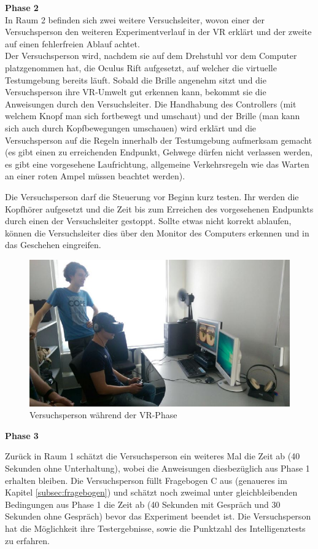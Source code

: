 \documentclass{Bericht}
\begin{document}
\textbf{Phase 2}\\ 
In Raum 2 befinden sich zwei weitere Versuchsleiter, wovon einer der Versuchsperson den weiteren Experimentverlauf in der VR erklärt und der zweite auf einen fehlerfreien Ablauf achtet.\\
Der Versuchsperson wird, nachdem sie auf dem Drehstuhl vor dem Computer platzgenommen hat, die Oculus Rift aufgesetzt, auf welcher die virtuelle Testumgebung bereits läuft. Sobald die Brille angenehm sitzt und die Versuchsperson ihre VR-Umwelt gut erkennen kann, bekommt sie die Anweisungen durch den Versuchsleiter. 
Die Handhabung des Controllers (mit welchem Knopf man sich fortbewegt und umschaut) und der Brille (man kann sich auch durch Kopfbewegungen umschauen) wird erklärt und die Versuchsperson auf die Regeln innerhalb der Testumgebung aufmerksam gemacht (es gibt einen zu erreichenden Endpunkt, Gehwege dürfen nicht verlassen werden, es gibt eine vorgesehene Laufrichtung, allgemeine Verkehrsregeln wie das Warten an einer roten Ampel müssen beachtet werden).  

Die Versuchsperson darf die Steuerung vor Beginn kurz testen. Ihr werden die Kopfhörer aufgesetzt und die Zeit bis zum Erreichen des vorgesehenen Endpunkts durch einen der Versuchsleiter gestoppt.
Sollte etwas nicht korrekt ablaufen, können die Versuchsleiter dies über den Monitor des Computers erkennen und in das Geschehen eingreifen.

\begin{figure}[H]
	\centering    
	\includegraphics[height=\textheight, width=\linewidth, keepaspectratio]{../Bilder/v.jpg}
	\caption{Versuchsperson während der VR-Phase}
	\label{img:versuchsperson-in-vr}
\end{figure}

\textbf{Phase 3}

Zurück in Raum 1 schätzt die Versuchsperson ein weiteres Mal die Zeit ab (40 Sekunden ohne Unterhaltung), wobei die Anweisungen diesbezüglich aus Phase 1 erhalten bleiben. Die Versuchsperson füllt Fragebogen C aus (genaueres im Kapitel \ref{subsec:fragebogen}) und schätzt noch zweimal unter gleichbleibenden Bedingungen aus Phase 1 die Zeit ab (40 Sekunden mit Gespräch und 30 Sekunden ohne Gespräch) bevor das Experiment beendet ist. Die Versuchsperson hat die Möglichkeit ihre Testergebnisse, sowie die Punktzahl des Intelligenztests zu erfahren.
\end{document}
